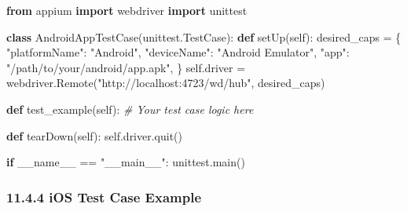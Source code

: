 \documentclass[
  paper=a4,
  ,captions=tableheading
]{scrartcl}
\newenvironment{Shaded}{}{}
\newcommand{\CommentTok}[1]{\textcolor[rgb]{0.38,0.63,0.69}{\textit{#1}}}
\newcommand{\ControlFlowTok}[1]{\textcolor[rgb]{0.00,0.44,0.13}{\textbf{#1}}}
\newcommand{\ImportTok}[1]{\textcolor[rgb]{0.00,0.50,0.00}{\textbf{#1}}}
\newcommand{\KeywordTok}[1]{\textcolor[rgb]{0.00,0.44,0.13}{\textbf{#1}}}
\newcommand{\NormalTok}[1]{#1}
\newcommand{\OperatorTok}[1]{\textcolor[rgb]{0.40,0.40,0.40}{#1}}
\newcommand{\StringTok}[1]{\textcolor[rgb]{0.25,0.44,0.63}{#1}}
\newcommand{\VariableTok}[1]{\textcolor[rgb]{0.10,0.09,0.49}{#1}}
\begin{document}
\begin{Shaded}
\begin{Highlighting}[]
\ImportTok{from}\NormalTok{ appium }\ImportTok{import}\NormalTok{ webdriver}
\ImportTok{import}\NormalTok{ unittest}

\KeywordTok{class}\NormalTok{ AndroidAppTestCase(unittest.TestCase):}
 \KeywordTok{def}\NormalTok{ setUp(}\VariableTok{self}\NormalTok{):}
\NormalTok{     desired\_caps }\OperatorTok{=}\NormalTok{ \{}
         \StringTok{"platformName"}\NormalTok{: }\StringTok{"Android"}\NormalTok{,}
         \StringTok{"deviceName"}\NormalTok{: }\StringTok{"Android Emulator"}\NormalTok{,}
         \StringTok{"app"}\NormalTok{: }\StringTok{"/path/to/your/android/app.apk"}\NormalTok{,}
\NormalTok{     \}}
     \VariableTok{self}\NormalTok{.driver }\OperatorTok{=}\NormalTok{ webdriver.Remote(}\StringTok{"http://localhost:4723/wd/hub"}\NormalTok{, desired\_caps)}

 \KeywordTok{def}\NormalTok{ test\_example(}\VariableTok{self}\NormalTok{):}
     \CommentTok{\# Your test case logic here}

 \KeywordTok{def}\NormalTok{ tearDown(}\VariableTok{self}\NormalTok{):}
     \VariableTok{self}\NormalTok{.driver.quit()}

\ControlFlowTok{if} \VariableTok{\_\_name\_\_} \OperatorTok{==} \StringTok{"\_\_main\_\_"}\NormalTok{:}
\NormalTok{ unittest.main()}
\end{Highlighting}
\end{Shaded}

\hypertarget{ios-test-case-example}{%
\subsubsection{11.4.4 iOS Test Case
Example}\label{ios-test-case-example}}
\end{document}
